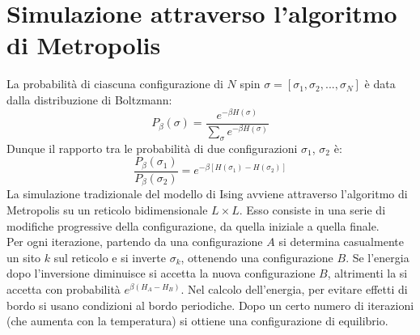 \documentclass[Lau, noexaminfo, oneside]{sapthesis} %
\begin{document}
\section{Simulazione attraverso l'algoritmo di Metropolis}
La probabilità di ciascuna configurazione di $N$ spin $\sigma = [\sigma_1, \sigma_2, ..., \sigma_N]$ è data dalla distribuzione di Boltzmann:
\begin{equation}
P_{\beta }(\sigma)={\frac {e^{-\beta H(\sigma )}}{\sum\limits_{\sigma} e^{-\beta H(\sigma )}}}
\end{equation}
Dunque il rapporto tra le probabilità di due configurazioni $\sigma_1$, $\sigma_2$ è:
\begin{equation}
\frac{P_{\beta }(\sigma_1)}{P_{\beta }(\sigma_2)} = e^{-\beta [H(\sigma_1) - H(\sigma_2)]}
\end{equation}
La simulazione tradizionale del modello di Ising avviene attraverso l'algoritmo di Metropolis su un reticolo bidimensionale $L \times L$.
Esso consiste in una serie di modifiche progressive della configurazione, da quella iniziale a quella finale. \\Per ogni iterazione, partendo da una configurazione $A$ si determina casualmente un sito $k$ sul reticolo e si inverte $\sigma_k$, ottenendo una configurazione $B$. Se l'energia dopo l'inversione diminuisce si accetta la nuova configurazione $B$, altrimenti la si accetta con probabilità $e^{\beta (H_A - H_B)}$. Nel calcolo dell'energia, per evitare effetti di bordo si usano condizioni al bordo periodiche. Dopo un certo numero di iterazioni (che aumenta con la temperatura) si ottiene una configurazione di equilibrio. \cite{metropolis-hastings}
\end{document}
